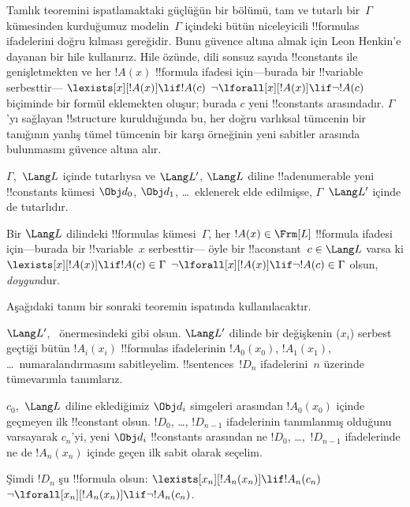



\begin{explain}
Tamlık teoremini ispatlamaktaki güçlüğün bir bölümü, tam ve tutarlı
bir~$\Gamma$ kümesinden kurduğumuz modelin~$\Gamma$ içindeki bütün
niceleyicili !!{formula}s ifadelerini doğru kılması gereğidir. Bunu
güvence altına almak için Leon Henkin'e dayanan bir hile kullanırız.
Hile özünde, dili sonsuz sayıda !!{constant}s ile genişletmekten ve her
$!A(x)$ !!{formula} ifadesi için---burada bir !!{variable} serbesttir---
      {$\lexists[x][!A(x)]\lif !A(c)$}
      {$\lnot\lforall[x][!A(x)]\lif\lnot !A(c)$}
biçiminde bir formül eklemekten oluşur; burada $c$ yeni
!!{constant}s arasındadır. $\Gamma$'yı sağlayan !!{structure}
kurulduğunda bu, her
{doğru varlıksal tümcenin bir tanığının}
{yanlış tümel tümcenin bir karşı örneğinin}
yeni sabitler arasında bulunmasını güvence altına alır.
\end{explain}

\begin{prop}
$\Gamma$,~$\Lang L$ içinde tutarlıysa ve $\Lang L'$,
$\Lang L$ diline !!a{denumerable} yeni !!{constant}s kümesi
$\Obj d_0$, $\Obj d_1$, \dots\ eklenerek elde edilmişse,
$\Gamma$~$\Lang L'$ içinde de tutarlıdır.
\end{prop}

\begin{defn}
Bir $\Lang L$ dilindeki !!{formula}s kümesi~$\Gamma$, her
$!A(x)\in\Frm[L]$ !!{formula} ifadesi için---burada bir !!{variable}~$x$
serbesttir---
öyle bir !!a{constant}~$c\in\Lang L$ varsa ki
      {$\lexists[x][!A(x)]\lif !A(c)\in\Gamma$}
      {$\lnot\lforall[x][!A(x)]\lif\lnot !A(c)\in\Gamma$}
olsun, \emph{doygun}dur.
\end{defn}

Aşağıdaki tanım bir sonraki teoremin ispatında kullanılacaktır.

\begin{defn}
$\Lang L'$,~ önermesindeki gibi olsun.
$\Lang L'$ dilinde bir değişkenin ($x_i$) serbest geçtiği bütün
$!A_i(x_i)$ !!{formula}s ifadelerinin $!A_0(x_0)$, $!A_1(x_1)$, \dots\
numaralandırmasını sabitleyelim. !!{sentence}s~$!D_n$ ifadelerini~$n$
üzerinde tümevarımla tanımlarız.

$c_0$,~$\Lang L$ diline eklediğimiz $\Obj d_i$ simgeleri arasından
$!A_0(x_0)$ içinde geçmeyen ilk !!{constant} olsun. $!D_0$, \dots,
$!D_{n-1}$ ifadelerinin tanımlanmış olduğunu varsayarak $c_n$'yi, yeni
$\Obj d_i$ !!{constant}s arasından ne $!D_0$, \dots,~$!D_{n-1}$
ifadelerinde ne de $!A_n(x_n)$ içinde geçen ilk sabit olarak seçelim.

Şimdi $!D_n$ şu !!{formula} olsun: 
{$\lexists[x_n][!A_n(x_n)]\lif !A_n(c_n)$}
{$\lnot\lforall[x_n][!A_n(x_n)]\lif\lnot !A_n(c_n)$}.
\end{defn}

